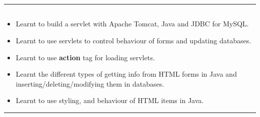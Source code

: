 \documentclass[12pt,letterpaper]{article}
\begin{document}
\newpage
\hrule
\subsection*{}
\renewcommand{\labelitemi}{$\textendash$}
\begin{itemize}
    \item Learnt to build a servlet with Apache Tomcat, Java and JDBC for MySQL.
    \item Learnt to use servlets to control behaviour of forms and updating databases.
    \item Learnt to use \textbf{action} tag for loading servlets.
    \item Learnt the different types of getting info from HTML forms in Java and inserting/deleting/modifying them in databases.
    \item Learnt to use styling, and behaviour of HTML items in Java.
\end{itemize}
\hrule
\end{document}
